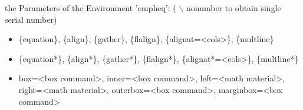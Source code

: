 \begin{remark}
the Parameters of the Environment 'empheq':	({\color{blue} $\backslash$ nonumber to obtain single serial number})
\begin{itemize}
	\item \{equation\}, \{align\}, \{gather\}, \{flalign\}, \{alignat=<cols>\}, \{multline\}
	\item \{equation*\}, \{align*\}, \{gather*\}, \{flalign*\}, \{alignat*=<cols>\}, \{multline*\}
	\item box=<box command>, inner=<box command>, left=<math material>, right=<math material>, outerbox=<box command>,
		marginbox=<box command>
\end{itemize}
\end{remark}

